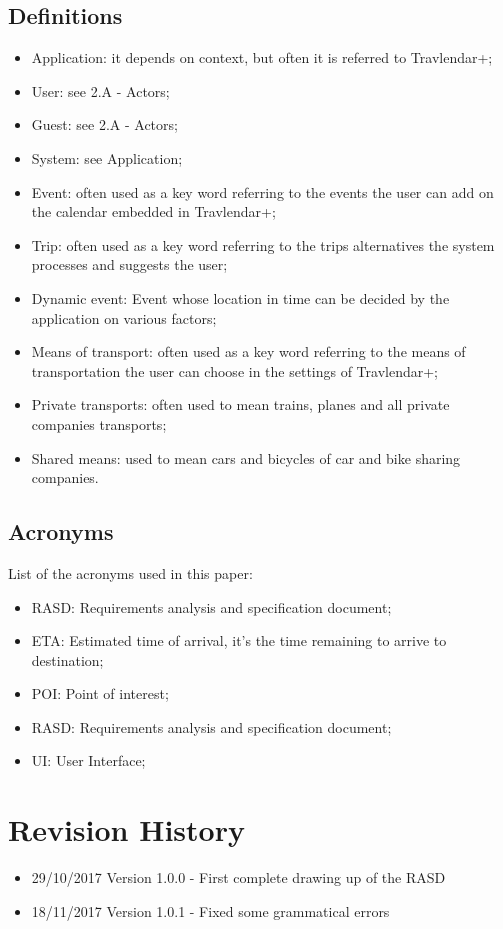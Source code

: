 \subsection{Definitions}
\begin{itemize}
\item Application: it depends on context, but often it is referred to Travlendar+;
\item User: see 2.A - Actors;
\item Guest: see 2.A - Actors;
\item System: see Application;
\item Event: often used as a key word referring to the events the user can add on the calendar embedded in Travlendar+;
\item Trip: often used as a key word referring to the trips alternatives the system processes and suggests the user;
\item Dynamic event: Event whose location in time can be decided by the application on various factors;
\item Means of transport: often used as a key word referring to the means of transportation the user can choose in the settings of Travlendar+;
\item Private transports: often used to mean trains, planes and all private companies transports;
\item Shared means: used to mean cars and bicycles of car and bike sharing companies.
\end{itemize}
%
\subsection{Acronyms}
List of the acronyms used in this paper:
\begin{itemize}
\item RASD: Requirements analysis and specification document;
\item ETA: Estimated time of arrival, it's the time remaining to arrive to destination;
\item POI: Point of interest;
\item RASD: Requirements analysis and specification document;
\item UI: User Interface;
\end{itemize}
%
%
\section{Revision History}
\begin{itemize}
\item 29/10/2017 Version 1.0.0 - First complete drawing up of the RASD
\item 18/11/2017 Version 1.0.1 - Fixed some grammatical errors
\end{itemize}
%
%
